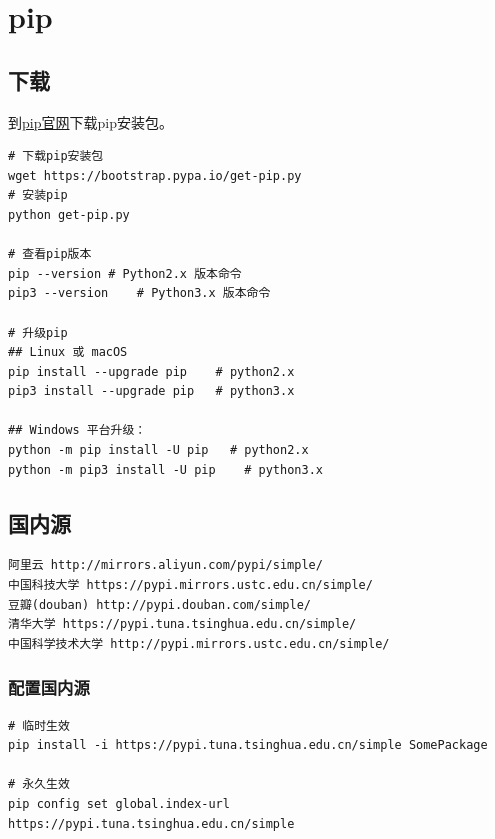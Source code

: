 \chapter{pip}

\section{下载}
到\href{https://pypi.org/project/pip/}{pip官网}下载pip安装包。
\begin{lstlisting}[style=demostyle,numbers=none]
# 下载pip安装包
wget https://bootstrap.pypa.io/get-pip.py
# 安装pip
python get-pip.py

# 查看pip版本
pip --version # Python2.x 版本命令
pip3 --version    # Python3.x 版本命令

# 升级pip
## Linux 或 macOS
pip install --upgrade pip    # python2.x
pip3 install --upgrade pip   # python3.x

## Windows 平台升级：
python -m pip install -U pip   # python2.x
python -m pip3 install -U pip    # python3.x
\end{lstlisting}

\section{国内源}
\begin{lstlisting}[style=demostyle,numbers=none]
阿里云 http://mirrors.aliyun.com/pypi/simple/ 
中国科技大学 https://pypi.mirrors.ustc.edu.cn/simple/ 
豆瓣(douban) http://pypi.douban.com/simple/ 
清华大学 https://pypi.tuna.tsinghua.edu.cn/simple/ 
中国科学技术大学 http://pypi.mirrors.ustc.edu.cn/simple/
\end{lstlisting}
\subsection{配置国内源}
\begin{lstlisting}[style=demostyle,numbers=none]
# 临时生效
pip install -i https://pypi.tuna.tsinghua.edu.cn/simple SomePackage

# 永久生效
pip config set global.index-url https://pypi.tuna.tsinghua.edu.cn/simple
\end{lstlisting}

